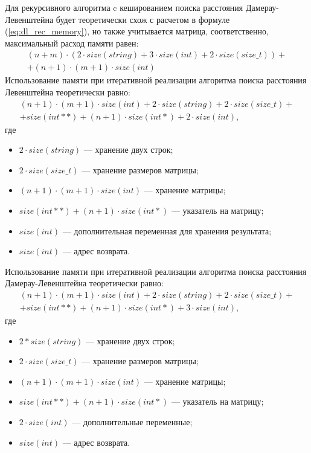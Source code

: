 Для рекурсивного алгоритма c кешированием поиска расстояния Дамерау-Левенштейна будет теоретически схож с расчетом в формуле (\ref{eq:dl_rec_memory}), но также учитывается матрица, соответственно, максимальный расход памяти равен:
\begin{equation}
	\label{eq:dl_hash_memory}
	\begin{aligned}
		(n + m) \cdot (2 \cdot size(string) + 3 \cdot size(int) + 2 \cdot size(size\_t)) + \\
		+ (n + 1) \cdot (m + 1) \cdot size(int)
	\end{aligned}
\end{equation}
Использование памяти при итеративной реализации алгоритма поиска расстояния Левенштейна теоретически равно:
\begin{equation}
	\label{eq:lev_mtr_memory}
	\begin{aligned}
		(n + 1) \cdot (m + 1) \cdot size(int) + 2 \cdot size(string) + 2 \cdot size(size\_t) + \\
		+ size(int **) + (n + 1) \cdot size(int *) + 2 \cdot size(int),
	\end{aligned}
\end{equation}
где 
\begin{itemize}
	\item $2 \cdot size(string)$ --- хранение двух строк;
	\item $2 \cdot size(size\_t)$ --- хранение размеров матрицы;
	\item $(n + 1) \cdot (m + 1) \cdot size(int)$ --- хранение матрицы;
	\item $size(int **) + (n + 1) \cdot size(int *)$ --- указатель на матрицу;
	\item $size(int)$ --- дополнительная переменная для хранения результата;
	\item $size(int)$ --- адрес возврата.
\end{itemize}

Использование памяти при итеративной реализации алгоритма поиска расстояния Дамерау-Левенштейна теоретически равно:
\begin{equation}
	\label{eq:dl_mtr_memory}
	\begin{aligned}
		(n + 1) \cdot (m + 1) \cdot size(int) + 2 \cdot size(string) + 2 \cdot size(size\_t) + \\
		+ size(int **) + (n + 1) \cdot size(int *) + 3 \cdot size(int),
	\end{aligned}
\end{equation}
где 
\begin{itemize}
	\item $2 * size(string)$ --- хранение двух строк;
	\item $2 \cdot size(size\_t)$ --- хранение размеров матрицы;
	\item $(n + 1) \cdot (m + 1) \cdot size(int)$ --- хранение матрицы;
	\item $size(int **) + (n + 1) \cdot size(int *)$ --- указатель на матрицу;
	\item $2 \cdot size(int)$ --- дополнительные переменные;
	\item $size(int)$ --- адрес возврата.
\end{itemize}


